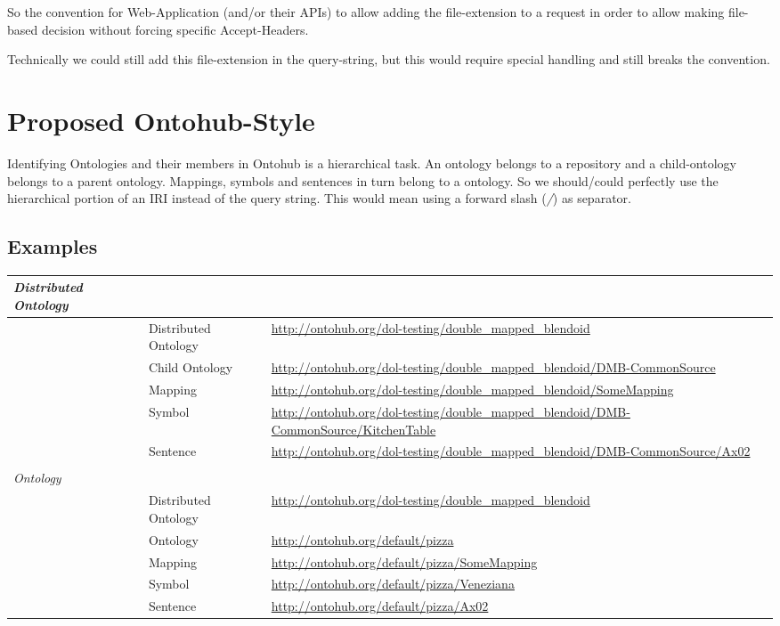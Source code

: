 \documentclass[a4paper,11pt,DIV=25]{scrartcl}
\begin{document}
So the convention for Web-Application (and/or their APIs) to allow adding the
file-extension to a request in order to allow making file-based decision
without forcing specific Accept-Headers.

Technically we could still add this file-extension in the query-string, but
this would require special handling and still breaks the convention.

\pagebreak

\section{Proposed Ontohub-Style}

Identifying Ontologies and their members in Ontohub is a hierarchical task. An
ontology belongs to a repository and a child-ontology belongs to a parent
ontology. Mappings, symbols and sentences in turn belong to a ontology. So we
should/could perfectly use the hierarchical portion of an IRI instead of the
query string. This would mean using a forward slash (\textit{/}) as separator.

\subsection{Examples}

\begin{tabularx}{\textwidth}{p{}p{}p{}}
  \textit{Distributed Ontology} & & \\
  \hline
  & Distributed Ontology & \url{http://ontohub.org/dol-testing/double_mapped_blendoid}\\
  & Child Ontology & \url{http://ontohub.org/dol-testing/double_mapped_blendoid/DMB-CommonSource}\\
  & Mapping & \url{http://ontohub.org/dol-testing/double_mapped_blendoid/SomeMapping}\\
  & Symbol & \url{http://ontohub.org/dol-testing/double_mapped_blendoid/DMB-CommonSource/KitchenTable}\\
  & Sentence & \url{http://ontohub.org/dol-testing/double_mapped_blendoid/DMB-CommonSource/Ax02}\\
  & & \\
  \textit{Ontology} & & \\
  \hline
  & Distributed Ontology & \url{http://ontohub.org/dol-testing/double_mapped_blendoid}\\
  & Ontology & \url{http://ontohub.org/default/pizza}\\
  & Mapping & \url{http://ontohub.org/default/pizza/SomeMapping}\\
  & Symbol & \url{http://ontohub.org/default/pizza/Veneziana}\\
  & Sentence & \url{http://ontohub.org/default/pizza/Ax02}\\
\end{tabularx}
\end{document}
